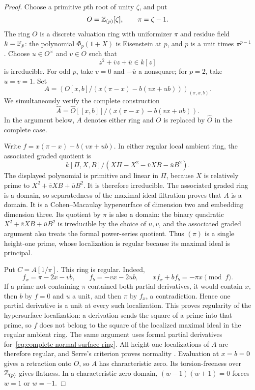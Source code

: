 \begin{proof}
Choose a primitive $p$th root of unity $\zeta$, and put
\[
 O=\mathbb Z_{(p)}[\zeta],\qquad \pi=\zeta-1.
\]
The ring $O$ is a discrete valuation ring with uniformizer $\pi$ and
residue field $k=\mathbb F_p$: the polynomial $\Phi_p(1+X)$ is Eisenstein at
$p$, and $p$ is a unit times $\pi^{p-1}$.
Choose $u\in O^\times$ and $v\in O$ such that
\[
 z^2+\overline v z+\overline u\in k[z]
\]
is irreducible.  For odd $p$, take $v=0$ and $-\overline u$ a nonsquare;
for $p=2$, take $u=v=1$.  Set
\begin{equation}\label{eq:normal-surface-ring}
 A=\left(O[x,b]/(x(\pi-x)-b(vx+ub))\right)_{(\pi,x,b)}.
\end{equation}
We simultaneously verify the complete construction
\begin{equation}\label{eq:complete-normal-surface-ring}
 \widehat A=\widehat O[[x,b]]/(x(\pi-x)-b(vx+ub)).
\end{equation}
In the argument below, $A$ denotes either ring and $O$ is replaced by
$\widehat O$ in the complete case.

Write $f=x(\pi-x)-b(vx+ub)$.  In either regular local ambient ring,
the associated graded quotient is
\[
 k[\Pi,X,B]/(X\Pi-X^2-\overline v XB-\overline u B^2).
\]
The displayed polynomial is primitive and linear in $\Pi$, because
$X$ is relatively prime to $X^2+\overline v XB+\overline u B^2$.
It is therefore irreducible.  The associated graded ring is a domain,
so separatedness of the maximal-ideal filtration proves that $A$ is
a domain.  It is a Cohen--Macaulay hypersurface of dimension two and
embedding dimension three.
Its quotient by $\pi$ is also a domain: the binary quadratic
$X^2+\overline v XB+\overline u B^2$ is irreducible by the choice of
$u,v$, and the associated graded argument also treats the formal
power-series quotient.  Thus $(\pi)$ is a single height-one prime,
whose localization is regular because its maximal ideal is principal.

Put $C=A[1/\pi]$.  This ring is regular.  Indeed,
\[
 f_x=\pi-2x-vb,\qquad f_b=-vx-2ub,
 \qquad xf_x+bf_b=-\pi x\pmod f.
\]
If a prime not containing $\pi$ contained both partial derivatives,
it would contain $x$, then $b$ by $f=0$ and $u$ a unit, and then
$\pi$ by $f_x$, a contradiction.  Hence one partial derivative is a
unit at every such localization.  This proves regularity of the
hypersurface localization: a derivation sends the square of a prime
into that prime, so $f$ does not belong to the square of the localized
maximal ideal in the regular ambient ring.  The same argument uses
formal partial derivatives for~\eqref{eq:complete-normal-surface-ring}.
All height-one localizations of $A$ are therefore regular, and Serre's
criterion proves normality \citep[Lemma 10.157.4, Tag 031S]{Stacks2026}.  Evaluation at $x=b=0$ gives a retraction
onto $O$, so $A$ has characteristic zero.  Its torsion-freeness over
$\mathbb Z_{(p)}$ gives flatness.  In a characteristic-zero domain,
$(w-1)(w+1)=0$ forces $w=1$ or $w=-1$.


\end{proof}
